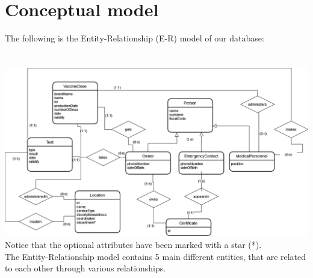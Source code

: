 \documentclass{article}
\begin{document}
\section{Conceptual model}
The following is the Entity-Relationship (E-R) model of our database:\\ \\ \\
\vspace{1cm}
\includegraphics[trim=1cm 1cm 1cm 1cm, width=15cm]{images/e-r.png}
Notice that the optional attributes have been marked with a star (*).\\
The Entity-Relationship model contains 5 main different entities, that are related to each other through various relationships.
\end{document}

